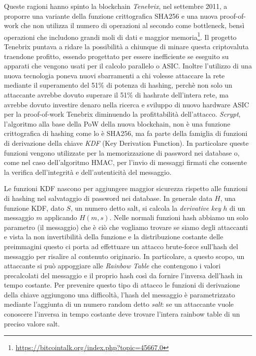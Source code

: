 	Queste ragioni hanno spinto la blockchain \textit{Tenebrix}, nel settembre 2011, a proporre una variante della funzione crittografica SHA256 e una nuova proof-of-work che non utilizza il numero di operazioni al secondo come bottleneck, bensì operazioni che includono grandi moli di dati e maggior memoria\footnote{\url{https://bitcointalk.org/index.php?topic=45667.0}}.
	Il progetto Tenebrix puntava a ridare la possibilità a chiunque di minare questa criptovaluta traendone profitto, essendo progettato per essere inefficiente se eseguito su apparati che vengono usati per il calcolo parallelo o ASIC. Inoltre l'utilizzo di una nuova tecnologia poneva nuovi sbarramenti a chi volesse attaccare la rete mediante il superamento del 51\% di potenza di hashing, perchè non solo un attaccante avrebbe dovuto superare il 51\% di hashrate dell'intera rete, ma avrebbe dovuto investire denaro nella ricerca e sviluppo di nuovo hardware ASIC per la proof-of-work Tenebrix diminuendo la profittabilità dell'attacco.
	\textit{Scrypt}, l'algoritmo alla base della PoW della nuova blockchain, non è una funzione crittografica di hashing come lo è SHA256, ma fa parte della famiglia di funzioni di derivazione della chiave \textit{KDF} (Key Derivation Function)\cite{percival2009stronger}. In particolare queste funzioni vengono utilizzate per la memorizzazione di password nei database o, come nel caso dell'algoritmo HMAC, per l'invio di messaggi firmati che consente la verifica dell'integrità e dell'autenticità del messaggio.
	
	Le funzioni KDF nascono per aggiungere maggior sicurezza rispetto alle funzioni di hashing nel salvataggio di password nei database. In generale data $H$, una funzione KDF, dato $S$, un numero detto salt, si calcola la \textit{derivative key} $h$ di un messaggio $m$ applicando $H(m,s)$. Nelle normali funzioni hash abbiamo un solo parametro (il messaggio) che è ciò che vogliamo trovare se siamo degli attaccanti e vista la non invertibilità della funzione e la distribuzione costante delle preimmagini questo ci porta ad effettuare un attacco brute-force sull'hash del messaggio per risalire al contenuto originario. In particolare, a questo scopo, un attaccante si può appoggiare alle \textit{Rainbow Table} che contengono i valori precalcolati del messaggio e il proprio hash così da fornire l'inversa dell'hash in tempo costante. Per prevenire questo tipo di attacco le funzioni di derivazione della chiave aggiungono una difficoltà, l'hash del messaggio è parametrizzato mediante l'aggiunta di un numero random detto \textit{salt}: se un attaccante vuole conoscere l'inversa in tempo costante deve trovare l'intera rainbow table di un preciso valore salt.
	
